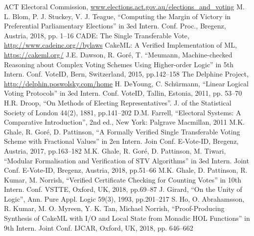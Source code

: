 \documentclass[10pt,conference]{IEEEtran}
\begin{document}

\begin{thebibliography}{00}
ACT Electoral Commission, \url{www.elections.act.gov.au/elections_and_voting} 
M. L. Blom, P. J. Stuckey, V. J. Teague, ``Computing the Margin of Victory in Preferential Parliamentary Elections'' in 3ed Intern. Conf. Proc., Bregenz, Austria, 2018, pp. 1--16
CADE: The Single Transferable Vote, \url{http://www.cadeinc.org//bylaws} 
CakeML: A Verified Implementation of ML, \url{https://cakeml.org/}
J.E. Dawson, R. Gor{\'{e}}, T. ``Meumann, Machine-checked Reasoning about Complex Voting Schemes Using Higher-order Logic'' in 5th Intern. Conf. VoteID, Bern, Switzerland, 2015, pp.142--158
The Delphine Project, \url{http://delphin.poswolsky.com/home}
H. DeYoung, C. Sch{\"{u}}rmann, ``Linear Logical Voting Protocols'' in 3ed Intern. Conf. VoteID, Tallin, Estonia, 2011, pp. 53--70
H.R. Droop, ``On Methods of Electing Representatives''. J. of the Statistical
  Society of London  44(2), 1881, pp.141--202
D.M. Farrell, ``Electoral Systems: A Comparative Introduction'', 2nd ed., New York: Palgrave Macmillan, 2011
M.K. Ghale, R. Gor{\'{e}}, D. Pattinson, ``A Formally Verified Single Transferable Voting Scheme with Fractional Values'' in 2en Intern. Join Conf. E-Vote-ID, Bregenz, Austria, 2017, pp.163--182
M.K. Ghale, R. Gor{\'{e}}, D. Pattinson, M. Tiwari,
 ``Modular Formalisation and Verification of STV Algorithms'' in 3ed Intern. Joint Conf. E-Vote-ID, Bregenz, Austria, 2018, pp.51--66
M.K. Ghale, D. Pattinson, R. Kumar, M. Norrish, ``Verified Certificate Checking for Counting Votes'' in 10th Intern. Conf. VSTTE, Oxford, UK, 2018, pp.69--87
J. Girard, ``On the Unity of Logic'', Ann. Pure Appl. Logic  59(3), 1993, pp.201--217
S. Ho, O. Abrahamsson, R. Kumar, M. O. Myreen, Y. K. Tan,  Michael Norrish, ``Proof-Producing Synthesis of CakeML with I/O and Local State from Monadic HOL Functions'' in 9th  Intern. Joint Conf. IJCAR, Oxford, UK, 2018, pp. 646--662

\end{thebibliography}
\end{document}

